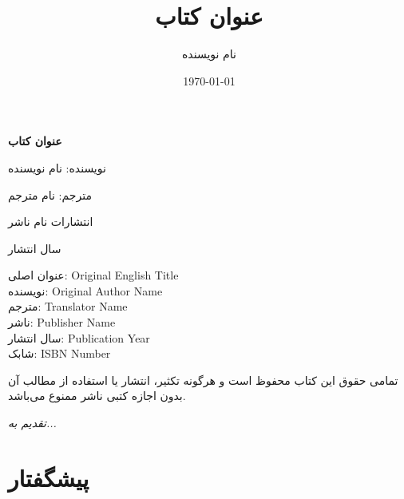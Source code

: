 \documentclass[12pt,a4paper,oneside]{book}
\title{عنوان کتاب}
\author{نام نویسنده}
\date{\today}
\begin{document}
\frontmatter

\begin{titlepage}
\centering
\vspace*{2cm}

{\Huge\bfseries عنوان کتاب}

\vspace{1.5cm}

{\Large نویسنده: نام نویسنده}

\vspace{1cm}

{\large مترجم: نام مترجم}

\vspace{2cm}


\vspace{2cm}

{\large انتشارات نام ناشر}

\vspace{1cm}

{\large سال انتشار}

\vfill

\end{titlepage}

\newpage
\thispagestyle{empty}
\vspace*{10cm}

\noindent
عنوان اصلی: Original English Title\\
نویسنده: Original Author Name\\
مترجم: Translator Name\\
ناشر: Publisher Name\\
سال انتشار: Publication Year\\
شابک: ISBN Number\\

\vspace{1cm}

\noindent
تمامی حقوق این کتاب محفوظ است و هرگونه تکثیر، انتشار یا استفاده از مطالب آن بدون اجازه کتبی ناشر ممنوع می‌باشد.

\newpage

\thispagestyle{empty}
\vspace*{8cm}
\begin{center}
{\large\itshape تقدیم به...}
\end{center}
\newpage

\chapter*{پیشگفتار}
\end{document}
